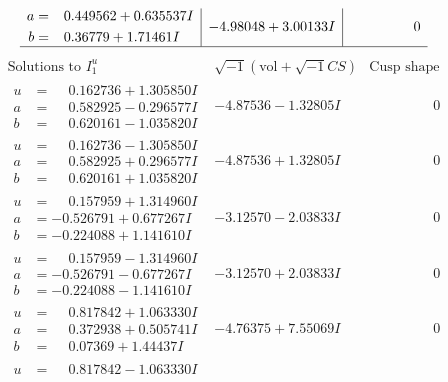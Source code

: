 \documentclass[1p]{elsarticle_modified}
\theoremstyle{definition}
\newcommand{\I}{\sqrt{-1}}
\begin{document}
$$\begin{array}{c|c|c}
\begin{aligned}
a &= \phantom{-}0.449562 + 0.635537 I \\
b &= \phantom{-}0.36779 + 1.71461 I\end{aligned}
 & -4.98048 + 3.00133 I & \phantom{-0.000000 } 0\\
 \hline 
 \end{array}$$\newpage$$\begin{array}{c|c|c}  
\text{Solutions to }I^u_{1}& \I (\text{vol} + \sqrt{-1}CS) & \text{Cusp shape}\\
 \hline 
\begin{aligned}
u &= \phantom{-}0.162736 + 1.305850 I \\
a &= \phantom{-}0.582925 - 0.296577 I \\
b &= \phantom{-}0.620161 - 1.035820 I\end{aligned}
 & -4.87536 - 1.32805 I & \phantom{-0.000000 } 0 \\ \hline\begin{aligned}
u &= \phantom{-}0.162736 - 1.305850 I \\
a &= \phantom{-}0.582925 + 0.296577 I \\
b &= \phantom{-}0.620161 + 1.035820 I\end{aligned}
 & -4.87536 + 1.32805 I & \phantom{-0.000000 } 0 \\ \hline\begin{aligned}
u &= \phantom{-}0.157959 + 1.314960 I \\
a &= -0.526791 + 0.677267 I \\
b &= -0.224088 + 1.141610 I\end{aligned}
 & -3.12570 - 2.03833 I & \phantom{-0.000000 } 0 \\ \hline\begin{aligned}
u &= \phantom{-}0.157959 - 1.314960 I \\
a &= -0.526791 - 0.677267 I \\
b &= -0.224088 - 1.141610 I\end{aligned}
 & -3.12570 + 2.03833 I & \phantom{-0.000000 } 0 \\ \hline\begin{aligned}
u &= \phantom{-}0.817842 + 1.063330 I \\
a &= \phantom{-}0.372938 + 0.505741 I \\
b &= \phantom{-}0.07369 + 1.44437 I\end{aligned}
 & -4.76375 + 7.55069 I & \phantom{-0.000000 } 0 \\ \hline\begin{aligned}
u &= \phantom{-}0.817842 - 1.063330 I \\

\end{aligned}
\end{array}$$
\end{document}
